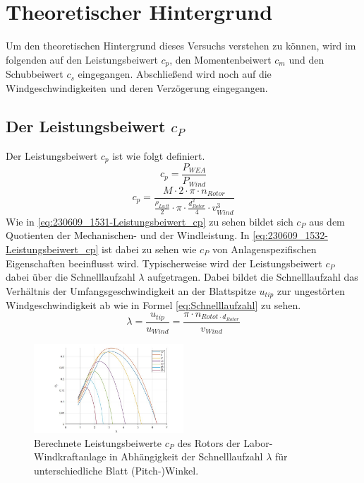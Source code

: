 \section{Theoretischer Hintergrund}
Um den theoretischen Hintergrund dieses Versuchs verstehen zu können, wird im folgenden auf den Leistungsbeiwert $c_{p}$, den Momentenbeiwert $c_{m}$ und den Schubbeiwert $c_{s}$ eingegangen. Abschließend wird noch auf die Windgeschwindigkeiten und deren Verzögerung eingegangen.
\subsection{Der Leistungsbeiwert \texorpdfstring{$c_P$}{}}
Der Leistungsbeiwert $c_{p}$ ist wie folgt definiert.
\begin{equation}
  c_{p}= \frac{P_{WEA}}{P_{Wind}}
    \label{eq:230609_1531-Leistungsbeiwert_cp}
\end{equation}
\begin{equation}
  c_{p}= \frac{M \cdot 2 \cdot \pi \cdot n_{Rotor}}{\frac{\rho_{Luft}}{2}\cdot \pi \cdot \frac{d^2_{Rotor}}{4} \cdot v^3_{Wind} }
    \label{eq:230609_1532-Leistungsbeiwert_cp}
\end{equation}
Wie in \autoref{eq:230609_1531-Leistungsbeiwert_cp} zu sehen bildet sich $c_P$ aus dem Quotienten der Mechanischen- und der Windleistung. 
In \autoref{eq:230609_1532-Leistungsbeiwert_cp} ist dabei zu sehen wie $c_P$ von Anlagenspezifischen Eigenschaften beeinflusst wird.
Typischerweise wird der Leistungsbeiwert $c_P$ dabei über die Schnelllaufzahl $\lambda$ aufgetragen. Dabei bildet die Schnelllaufzahl das Verhältnis der Umfangsgeschwindigkeit an der Blattspitze $u_{tip}$ zur ungestörten Windgeschwindigkeit ab wie in Formel \ref{eq:Schnelllaufzahl} zu sehen.
\begin{equation}
\lambda=\frac{u_{tip}}{u_{Wind}}=\frac{\pi \cdot n_{Rotot \cdot d_{Rotor}}}{v_{Wind}}
    \label{eq:Schnelllaufzahl}
\end{equation}

\begin{figure}[h!]
    \centering
    \includegraphics[width=0.5\textwidth]{Abbildungen/cpzulambda.jpg}
    \caption{Berechnete Leistungsbeiwerte $c_P$ des Rotors der Labor-Windkraftanlage in Abhängigkeit der Schnelllaufzahl $\lambda$ für unterschiedliche Blatt (Pitch-)Winkel.\cite{Anleitung}}
    \label{fig:cpzulambda}
\end{figure}

